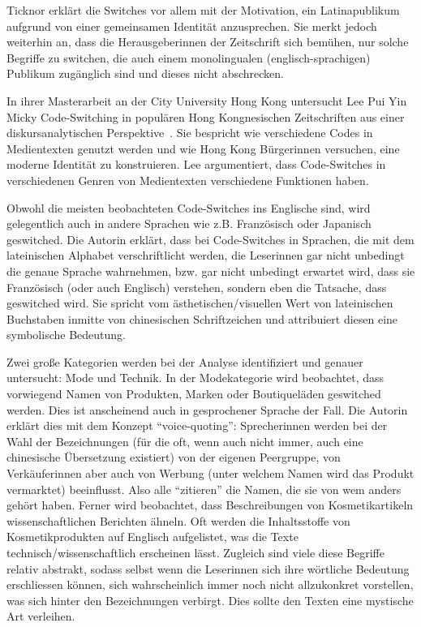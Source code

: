 Ticknor erklärt die Switches vor allem mit der Motivation, ein Latinapublikum aufgrund von einer gemeinsamen Identität anzusprechen.
Sie merkt jedoch weiterhin an, dass die Herausgeberinnen der Zeitschrift sich bemühen, nur solche Begriffe zu switchen, die auch einem monolingualen (englisch-sprachigen) Publikum zugänglich sind und dieses nicht abschrecken.



In ihrer Masterarbeit an der City University Hong Kong untersucht Lee Pui Yin Micky Code-Switching in populären Hong Kongnesischen Zeitschriften aus einer diskursanalytischen Perspektive~\cite[]{Lee99}.
Sie bespricht wie verschiedene Codes in Medientexten genutzt werden und wie Hong Kong Bürgerinnen versuchen, eine moderne Identität zu konstruieren.
Lee argumentiert, dass Code-Switches in verschiedenen Genren von Medientexten verschiedene Funktionen haben.

Obwohl die meisten beobachteten Code-Switches ins Englische sind, wird gelegentlich auch in andere Sprachen wie z.B. Französisch oder Japanisch geswitched.
Die Autorin erklärt, dass bei Code-Switches in Sprachen, die mit dem lateinischen Alphabet verschriftlicht werden, die Leserinnen gar nicht unbedingt die genaue Sprache wahrnehmen, bzw. gar nicht unbedingt erwartet wird, dass sie Französisch (oder auch Englisch) verstehen, sondern eben die Tatsache, dass geswitched wird.
Sie spricht vom ästhetischen/visuellen Wert von lateinischen Buchstaben inmitte von chinesischen Schriftzeichen und attribuiert diesen eine symbolische Bedeutung.

Zwei große Kategorien werden bei der Analyse identifiziert und genauer untersucht: Mode und Technik.
In der Modekategorie wird beobachtet, dass vorwiegend Namen von Produkten, Marken oder Boutiqueläden geswitched werden.
Dies ist anscheinend auch in gesprochener Sprache der Fall.
Die Autorin erklärt dies mit dem Konzept ``voice-quoting'': Sprecherinnen werden bei der Wahl der Bezeichnungen (für die oft, wenn auch nicht immer, auch eine chinesische Übersetzung existiert) von der eigenen Peergruppe, von Verkäuferinnen aber auch von Werbung (unter welchem Namen wird das Produkt vermarktet) beeinflusst.
Also alle ``zitieren'' die Namen, die sie von wem anders gehört haben.
Ferner wird beobachtet, dass Beschreibungen von Kosmetikartikeln wissenschaftlichen Berichten ähneln.
Oft werden die Inhaltsstoffe von Kosmetikprodukten auf Englisch aufgelistet, was die Texte technisch/wissenschaftlich erscheinen lässt.
Zugleich sind viele diese Begriffe relativ abstrakt, sodass selbst wenn die Leserinnen sich ihre wörtliche Bedeutung erschliessen können, sich wahrscheinlich immer noch nicht allzukonkret vorstellen, was sich hinter den Bezeichnungen verbirgt.
Dies sollte den Texten eine mystische Art verleihen.

